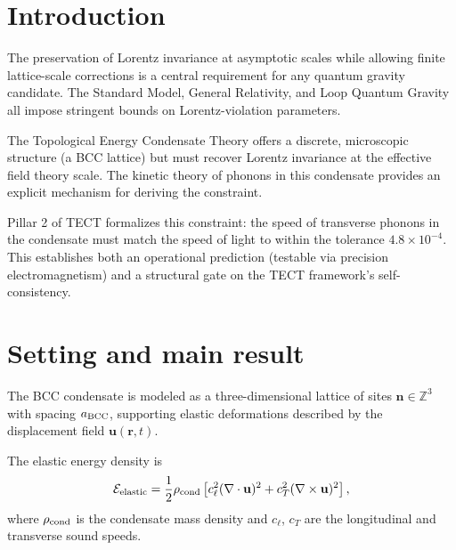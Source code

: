 \maketitle

\section{Introduction}
The preservation of Lorentz invariance at asymptotic scales while allowing
finite lattice-scale corrections is a central requirement for any quantum
gravity candidate. The Standard Model, General Relativity, and Loop Quantum
Gravity all impose stringent bounds on Lorentz-violation parameters.

The Topological Energy Condensate Theory offers a discrete, microscopic
structure (a BCC lattice) but must recover Lorentz invariance at the
effective field theory scale. The kinetic theory of phonons in this
condensate provides an explicit mechanism for deriving the constraint.

Pillar 2 of TECT formalizes this constraint: the speed of transverse phonons
in the condensate must match the speed of light to within the tolerance
$4.8 \times 10^{-4}$. This establishes both an operational prediction
(testable via precision electromagnetism) and a structural gate on the
TECT framework's self-consistency.

\section{Setting and main result}
The BCC condensate is modeled as a three-dimensional lattice of sites
$\mathbf{n} \in \mathbb{Z}^3$ with spacing $a_{\rm BCC}$, supporting
elastic deformations described by the displacement field
$\mathbf{u}(\mathbf{r}, t)$.

The elastic energy density is
\begin{equation}
\mathcal{E}_{\rm elastic} = \frac{1}{2}\rho_{\rm cond}\left[c_\ell^2(\nabla \cdot \mathbf{u})^2
+ c_T^2(\nabla \times \mathbf{u})^2\right],
\label{eq:elastic}
\end{equation}
where $\rho_{\rm cond}$ is the condensate mass density and $c_\ell$, $c_T$ are
the longitudinal and transverse sound speeds.

